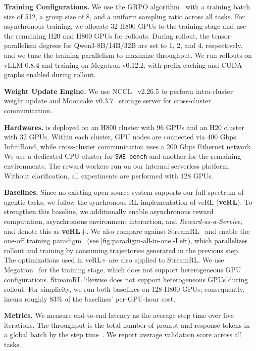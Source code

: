 \noindent\textbf{Training Configurations.} We use the GRPO algorithm~\cite{he2025deepmath} with a training batch size of 512, a group size of 8, and a uniform sampling ratio across all tasks. For asynchronous training, we allocate 32 H800 GPUs to the training stage and use the remaining H20 and H800 GPUs for rollouts. During rollout, the tensor-parallelism degrees for Qwen3-8B/14B/32B are set to 1, 2, and 4, respectively, and we tune the training parallelism to maximize throughput. We run rollouts on vLLM 0.8.4 and training on Megatron v0.12.2, with prefix caching and CUDA graphs enabled during rollout.


\noindent\textbf{Weight Update Engine.} We use NCCL~\cite{nccl} v2.26.5 to perform intra-cluster weight update and Mooncake v0.3.7~\cite{qin2024mooncake} storage server for cross-cluster communication. 

\noindent\textbf{Hardwares.} \SystemName{} is deployed on an H800 cluster with 96 GPUs and an H20 cluster with 32 GPUs. Within each cluster, GPU nodes are connected via 400 Gbps InfiniBand, while cross-cluster communication uses a 200 Gbps Ethernet network. We use a dedicated CPU cluster for \texttt{SWE-bench} and another for the remaining environments. The reward workers run on our internal serverless platform. Without clarification, all experiments are performed with 128 GPUs. 

\noindent\textbf{Baselines.} Since no existing open-source system supports our full spectrum of agentic tasks, we follow the synchronous RL implementation of veRL (\textbf{veRL}). To strengthen this baseline, we additionally enable asynchronous reward computation, asynchronous environment interaction, and \textit{Reward-as-a-Service}, and denote this as \textbf{veRL+}. We also compare against StreamRL~\cite{StreamRL} and enable the one-off training paradigm~\cite{deepscaler2025} (see \autoref{fig:paradigm-all-in-one}-Left), which parallelizes rollout and training by consuming trajectories generated in the previous step. The optimizations used in veRL+ are also applied to StreamRL. We use Megatron~\cite{shoeybi2019megatron} for the training stage, which does not support heterogeneous GPU configurations. StreamRL likewise does not support heterogeneous GPUs during rollout. For simplicity, we run both baselines on 128 H800 GPUs; consequently, \SystemName{} incurs roughly 83\% of the baselines’ per-GPU-hour cost.

\noindent\textbf{Metrics.} We measure end-to-end latency as the average step time over five iterations. The throughput is the total number of prompt and response tokens in a global batch by the step time~\cite{sheng2025hybridflow}. We report average validation score across all tasks.



